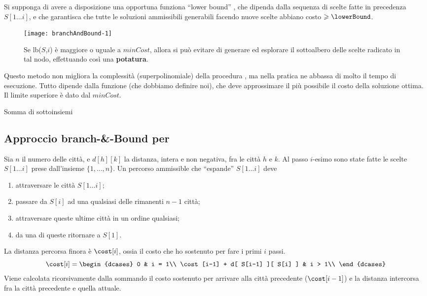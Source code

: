 Si supponga di avere a disposizione una opportuna funziona \enquote{lower bound} {}, che dipenda dalla sequenza di scelte fatte in precedenza \(S[1 \dots i]\), e che garantisca che tutte le soluzioni ammissibili generabili facendo nuove scelte abbiano costo \(\geqslant \lowerBound\).

\begin{figure}[H]
	\centering
	\texttt{[image: branchAndBound-1]}
	\caption[Esempio di potatura nell'albero di scelte per un algoritmo branch-\&-bound]{Se \textsf{lb}(\(S\),\(i\)) è maggiore o uguale a \(minCost\), allora si può evitare di generare ed esplorare il sottoalbero delle scelte radicato in tal nodo, effettuando così una \textbf{potatura}.}
\end{figure}

Questo metodo non migliora la complessità (superpolinomiale) della procedura \enumeration, ma nella pratica ne abbassa di molto il tempo di esecuzione.
Tutto dipende dalla funzione \lowerBound (che dobbiamo definire noi), che deve approssimare il più possibile il costo della soluzione ottima.
Il limite superiore è dato dal \(minCost\).

\begin{algorithm}[H]
	\caption{Somma di sottoinsiemi}
	
\end{algorithm}

\subsection{Approccio branch-\&-Bound per {\tsp}}

Sia \(n\) il numero delle città, e \(d[h][k]\) la distanza, intera e non negativa, fra le città \(h\) e \(k\).
Al passo \(i\)-esimo sono state fatte le scelte \(S[1 \dots i]\) prese dall'insieme \(\{1, \dots, n\}\).
Un percorso ammissible che \enquote{espande} \(S[1 \dots i]\) deve
\begin{enumerate}[label=\arabic*)]
	\item attraversare le città \(S[1 \dots i]\);
	\item passare da \(S[i]\) ad una qualsiasi delle rimanenti \(n-1\) città;
	\item attraversare queste ultime città in un ordine qualsiasi;
	\item da una di queste ritornare a \(S[1]\).
\end{enumerate}

La distanza percorsa finora è \(\cost[i]\), ossia il costo che ho sostenuto per fare i primi \(i\) passi.
\[
	\cost[i] =
	\begin{dcases}
		0                               & i = 1\\
		\cost[i-1] + d[ S[i-1] ][ S[i] ] & i > 1\\
	\end{dcases}
\]
Viene calcolata ricorsivamente dalla sommando il costo sostenuto per arrivare alla città precedente (\(\cost[i-1]\)) e la distanza intercorsa fra la città precedente e quella attuale.

